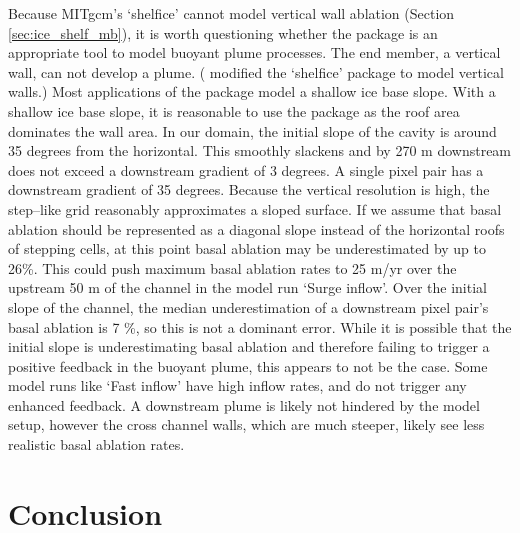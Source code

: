 Because MITgcm's `shelfice' cannot model vertical wall ablation (Section \ref{sec:ice_shelf_mb}), it is worth questioning whether the package is an appropriate tool to model buoyant plume processes. The end member, a vertical wall, can not develop a plume. (\cite{xu2012numerical} modified the `shelfice' package to model vertical walls.) Most applications of the package \citep[e.g.][]{goldberg2019accurately,schodlok2012sensitivity} model a shallow ice base slope. With a shallow ice base slope, it is reasonable to use the package as the roof area dominates the wall area. In our domain, the initial slope of the cavity is around 35 degrees from the horizontal. This smoothly slackens and by 270 m downstream  does not exceed a downstream gradient of 3 degrees. A single pixel pair has a downstream gradient of 35 degrees. Because the vertical resolution is high, the step--like grid reasonably approximates a sloped surface. If we assume that  basal ablation should be represented as a diagonal slope instead of the horizontal roofs of stepping cells, at this point basal ablation may be underestimated by up to 26\%. This could push maximum basal ablation rates to 25 m/yr over the upstream 50 m of the channel in the model run `Surge inflow'. Over the initial slope of the channel, the median underestimation of a downstream pixel pair's basal ablation is 7 \%, so this is not a dominant error. While it is possible that the initial slope is underestimating basal ablation and therefore failing to trigger a positive feedback in the buoyant plume, this appears to not be the case. Some model runs like `Fast inflow' have high inflow rates, and do not trigger any enhanced feedback. A downstream plume is likely not hindered by the model setup, however the cross channel walls, which are much steeper, likely see less realistic basal ablation rates. 


\section{Conclusion}

